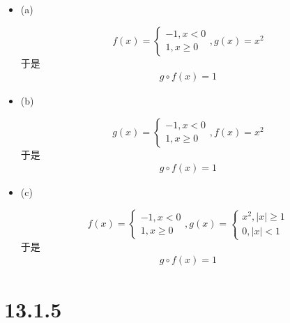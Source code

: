 \documentclass{article}
\begin{document}
\begin{itemize}
  \item (a)

        \begin{equation*}
          f(x) =
          \begin{cases}
            -1, x < 0 \\
            1, x \geq 0
          \end{cases}
          ,g(x) = x^2
        \end{equation*}
        于是
        \begin{align*}
          g \circ f(x) = 1
        \end{align*}

  \item (b)

        \begin{equation*}
          g(x) =
          \begin{cases}
            -1, x < 0 \\
            1, x \geq 0
          \end{cases}
          ,f(x) = x^2
        \end{equation*}
        于是
        \begin{align*}
          g \circ f(x) = 1
        \end{align*}

  \item (c)

        \begin{equation*}
          f(x) =
          \begin{cases}
            -1, x < 0 \\
            1, x \geq 0
          \end{cases}
          ,g(x) =
          \begin{cases}
            x^2, |x| \geq 1 \\
            0, |x| < 1
          \end{cases}
        \end{equation*}
        于是
        \begin{align*}
          g \circ f(x) = 1
        \end{align*}

\end{itemize}

\section*{13.1.5}
\end{document}
